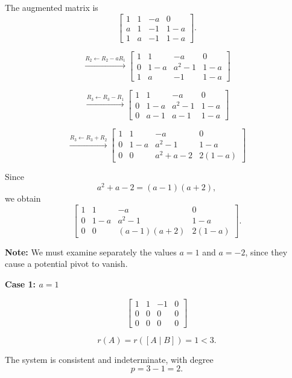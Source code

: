 \begin{answer}
    The augmented matrix is
    $$
    \left[
    \begin{array}{ccc|c}
    1&1&-a&0\\
    a&1&-1&1-a\\
    1&a&-1&1-a
    \end{array}
    \right].
    $$

    $$
    \xrightarrow{R_2\leftarrow R_2-aR_1}
    \left[
    \begin{array}{ccc|c}
    1&1&-a&0\\
    0&1-a&a^2-1&1-a\\
    1&a&-1&1-a
    \end{array}
    \right]
    $$

    $$
    \xrightarrow{R_3\leftarrow R_3-R_1}
    \left[
    \begin{array}{ccc|c}
    1&1&-a&0\\
    0&1-a&a^2-1&1-a\\
    0&a-1&a-1&1-a
    \end{array}
    \right]
    $$

    $$
    \xrightarrow{R_3\leftarrow R_3+R_2}
    \left[
    \begin{array}{ccc|c}
    1&1&-a&0\\
    0&1-a&a^2-1&1-a\\
    0&0&a^2+a-2&2(1-a)
    \end{array}
    \right]
    $$

    Since
    $$
    a^2+a-2=(a-1)(a+2),
    $$
    we obtain
    $$
    \left[
    \begin{array}{ccc|c}
    1&1&-a&0\\
    0&1-a&a^2-1&1-a\\
    0&0&(a-1)(a+2)&2(1-a)
    \end{array}
    \right].
    $$

    {\color{red}
    \textbf{Note:} We must examine separately the values $a=1$ and $a=-2$,
    since they cause a potential pivot to vanish.}

    \textbf{Case 1: $a=1$}

    $$
    \left[
    \begin{array}{ccc|c}
    1&1&-1&0\\
    0&0&0&0\\
    0&0&0&0
    \end{array}
    \right]
    $$

    $$
    r(A)=r([A\mid B])=1<3.
    $$

    The system is consistent and
    indeterminate, with degree
    $$
    p=3-1=2.
    $$


\end{answer}
